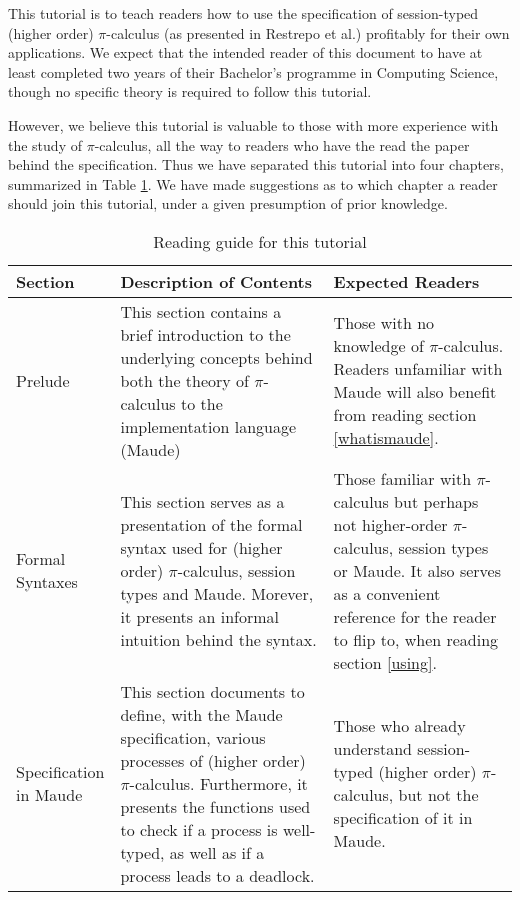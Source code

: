 This tutorial is to teach readers how to use the specification of session-typed (higher order) $\pi$-calculus (as presented in Restrepo et al.\cite{main}) profitably for their own applications. We expect that the intended reader of this document to have at least completed two years of their Bachelor's programme in Computing Science, though no specific theory is required to follow this tutorial.

However, we believe this tutorial is valuable to those with more experience with the study of $\pi$-calculus, all the way to readers who have the read the paper behind the specification. Thus we have separated this tutorial into four chapters, summarized in Table \ref{suggestedreading}. We have made suggestions as to which chapter a reader should join this tutorial, under a given presumption of prior knowledge.

\begin{table}[H]
\centering
\bgroup
\def\arraystretch{1.5}
\begin{tabular}{|>{\raggedright}m{0.16\linewidth} | m{0.45\linewidth} | m{0.4\linewidth}|}
\hline
\textbf{Section} & \textbf{Description of Contents} & \textbf{Expected Readers} \\ \hline

Prelude & This section contains a brief introduction to the underlying concepts behind both the theory of $\pi$-calculus to the implementation language (Maude) & Those with no knowledge of $\pi$-calculus. Readers unfamiliar with Maude will also benefit from reading section \ref{whatismaude}.\\ \hline
Formal Syntaxes & This section serves as a presentation of the formal syntax used for (higher order) $\pi$-calculus, session types and Maude. Morever, it presents an informal intuition behind the syntax. & Those familiar with $\pi$-calculus but perhaps not higher-order $\pi$-calculus, session types or Maude. It also serves as a convenient reference for the reader to flip to, when reading section \ref{using}.\\ \hline
Specification in Maude & This section documents to define, with the Maude specification, various processes of (higher order) $\pi$-calculus. Furthermore, it presents the functions used to check if a process is well-typed, as well as if a process leads to a deadlock. & Those who already understand session-typed (higher order) $\pi$-calculus, but not the specification of it in Maude. \\ \hline
\end{tabular}
\egroup
\caption{\label{suggestedreading} Reading guide for this tutorial}
\end{table}

